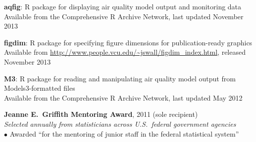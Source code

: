 \documentclass[11pt]{article}
\def\newsectn{\vspace*{0.6cm}}
\begin{document}
\begin{list}{. }
{
\setlength{\topsep}{0em}
\setlength{\labelsep}{0em}
\setlength{\labelwidth}{0em}
\setlength{\itemindent}{0em}
\setlength{\leftmargin}{0cm}
\setlength{\itemsep}{0cm}
}
\item \textbf{aqfig}: R package for displaying air quality model output and monitoring data\\
Available from the Comprehensive R Archive Network, last updated November 2013  %

\item \textbf{figdim}: R package for specifying figure dimensions for publication-ready graphics\\
Available from \url{http://www.people.vcu.edu/~jswall/figdim_index.html}, released November 2013

\item \textbf{M3}: R package for reading and manipulating air quality model output from Models3-formatted files\\
Available from the Comprehensive R Archive Network, last updated May 2012  %
\end{list}




\newsectn
{}

\textbf{Jeanne E.~Griffith Mentoring Award}, 2011 (sole recipient)\\  %
\textit{Selected annually from statisticians across U.S.~federal government agencies}\\
$\bullet$ Awarded ``for the mentoring of junior staff in the federal statistical
system''
\end{document}
